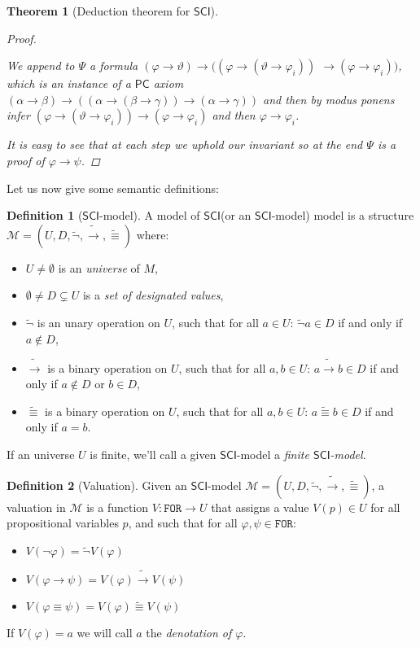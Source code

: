 \documentclass{article}
\newtheorem{theorem}{Theorem}
\theoremstyle{definition}
\newtheorem{definition}{Definition}[section]
\theoremstyle{definition}
\theoremstyle{definition}
\newcommand*{\id}{\equiv}
\newcommand*{\ra}{\rightarrow}
\newcommand*{\FOR}{\texttt{FOR}}
\newcommand{\SCI}{$\mathsf{SCI}$\xspace}
\newcommand{\PC}{$\mathsf{PC}$\xspace}
\begin{document}
\begin{theorem}[Deduction theorem for \SCI]
\begin{proof}
\begin{itemize}
                  We append to $\Psi$ a formula $(\varphi \ra \vartheta) \ra( (\varphi \ra
                      (\vartheta \ra \varphi_i))$ $ \ra (\varphi \ra \varphi_i) )$, which is an
                  instance of a \PC axiom $(\alpha \ra \beta) \ra ( (\alpha \ra (\beta \ra
                      \gamma)) \ra (\alpha \ra \gamma) )$ and then by \emph{modus ponens} infer
                  $(\varphi \ra (\vartheta \ra \varphi_i)) \ra (\varphi \ra \varphi_i)$ and then
                  $\varphi \ra \varphi_i$.
        \end{itemize}

        It is easy to see that at each step we uphold our invariant so at the end
        $\Psi$ is a proof of $\varphi \ra \psi$.

    \end{proof}
\end{theorem}

Let us now give some semantic definitions:

\begin{definition}[\SCI-model]
    A model of \SCI (or an \SCI-model) model is a structure $\mathcal{M} = (U, D, \tilde{\lnot}, \tilde{\ra}, \tilde{\id})$ where:
    \begin{itemize}
        \item $U \not = \emptyset$ is an \emph{universe} of $M$,
        \item $\emptyset \not = D \subsetneq U$ is a \emph{set of designated values},
        \item $\tilde{\lnot}$ is an unary operation on $U$, such that for all $a \in U$: $\tilde{\lnot}a \in D$ if and only if $a \not \in D$,
        \item $\tilde{\ra}$ is a binary operation on $U$, such that for all $a, b \in U$: $a \tilde{\ra} b \in D$ if and only if $a \not \in D$ or $b \in D$,
        \item $\tilde{\id}$ is a binary operation on $U$, such that for all $a, b \in U$: $a \tilde{\id} b \in D$ if and only if $a = b$.
    \end{itemize}
    \label{model}
\end{definition}
%
If an universe $U$ is finite, we'll call a given \SCI-model a \emph{finite
    \SCI-model}.

\begin{definition}[Valuation]
    Given an \SCI-model $\mathcal{M} = (U, D, \tilde{\lnot}, \tilde{\ra}, \tilde{\id})$, a valuation in $\mathcal{M}$ is a function $V : \FOR \longrightarrow U$ that assigns a value $V(p) \in U$ for all propositional variables $p$, and such that for all $\varphi, \psi \in \FOR$:
    \begin{itemize}
        \item $V(\lnot \varphi) = \tilde{\lnot}V(\varphi)$
        \item $V(\varphi \ra \psi) = V(\varphi) \tilde{\ra} V(\psi)$
        \item $V(\varphi \id \psi) = V(\varphi) \tilde{\id} V(\psi)$
    \end{itemize}
    If $V(\varphi) = a$ we will call $a$ the \emph{denotation of $\varphi$}.
    \label{valuation}
\end{definition}
\end{document}
